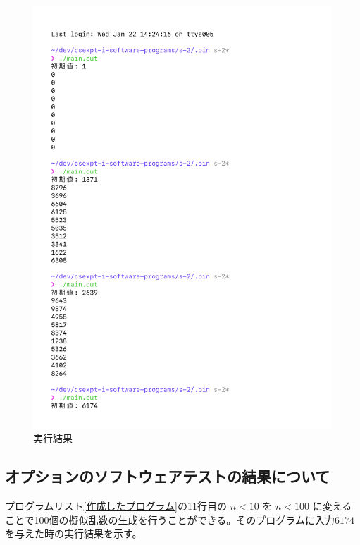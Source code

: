 \begin{figure}[H]
    \ContinuedFloat
    \centering
    \includegraphics[width=0.8\hsize, pagebox=mediabox, page=3]{main_result.pdf}
    \caption{実行結果}
    \label{実行結果}
\end{figure}


\subsection{オプションのソフトウェアテストの結果について}

プログラムリスト\ref{作成したプログラム}の11行目の $n < 10$ を $n < 100$ に変えることで100個の擬似乱数の生成を行うことができる。そのプログラムに入力$6174$を与えた時の実行結果を示す。

